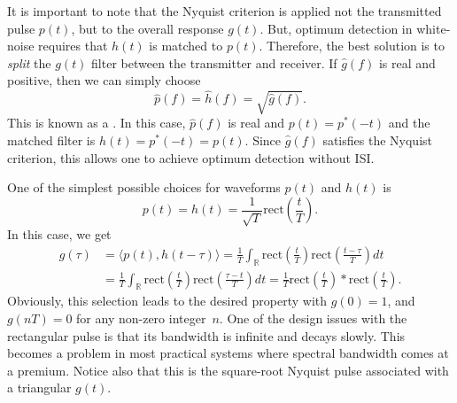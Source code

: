 It is important to note that the Nyquist criterion is applied not the transmitted pulse $p(t)$, but to the overall response $g(t)$.
But, optimum detection in white-noise requires that $h (t)$ is matched to $p(t)$.
Therefore, the best solution is to \emph{split} the $g(t)$ filter between the transmitter and receiver.
If $\hat{g}(f)$ is real and positive, then we can simply choose
\[ \hat{p}(f) = \hat{h} (f) = \sqrt{\hat{g}(f)}. \]
This is known as a .
In this case, $\hat{p}(f)$ is real and $p(t) = p^* (-t)$ and the matched filter is $h(t) = p^*(-t) = p(t)$.
Since $\hat{g}(f)$ satisfies the Nyquist criterion, this allows one to achieve optimum detection without ISI.

\begin{example}
One of the simplest possible choices for waveforms $p(t)$ and $h (t)$ is
\begin{equation*}
p(t) = h (t) = \frac{1}{\sqrt{T}} \mathrm{rect} \left( \frac{t}{T} \right) .
\end{equation*}
In this case, we get
\begin{equation*}
\begin{split}
g(\tau) &= \langle p(t), h (t-\tau) \rangle
= \frac{1}{T} \int_{\mathbb{R}} \mathrm{rect} \left( \frac{t}{T} \right)
\mathrm{rect} \left( \frac{t - \tau}{T} \right) dt \\
&= \frac{1}{T} \int_{\mathbb{R}} \mathrm{rect} \left( \frac{t}{T} \right)
\mathrm{rect} \left( \frac{\tau - t}{T} \right) dt
= \frac{1}{T} \mathrm{rect} \left( \frac{t}{T} \right)
\ast \mathrm{rect}\left( \frac{t}{T} \right) .
\end{split}
\end{equation*}
Obviously, this selection leads to the desired property with $g(0) = 1$, and $g(nT) = 0$ for any non-zero integer~$n$.
One of the design issues with the rectangular pulse is that its bandwidth is infinite and decays slowly.
This becomes a problem in most practical systems where spectral bandwidth comes at a premium.
Notice also that this is the square-root Nyquist pulse associated with a triangular $g(t)$.
\end{example}

